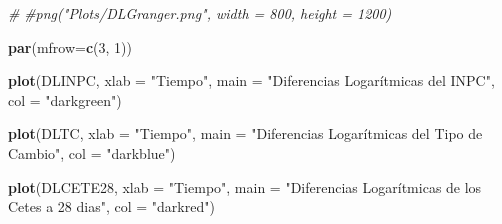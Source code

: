 \documentclass[
]{book}
\newenvironment{Shaded}{\begin{snugshade}}{\end{snugshade}}
\newcommand{\AttributeTok}[1]{\textcolor[rgb]{0.13,0.29,0.53}{#1}}
\newcommand{\CommentTok}[1]{\textcolor[rgb]{0.56,0.35,0.01}{\textit{#1}}}
\newcommand{\DecValTok}[1]{\textcolor[rgb]{0.00,0.00,0.81}{#1}}
\newcommand{\FunctionTok}[1]{\textcolor[rgb]{0.13,0.29,0.53}{\textbf{#1}}}
\newcommand{\NormalTok}[1]{#1}
\newcommand{\OtherTok}[1]{\textcolor[rgb]{0.56,0.35,0.01}{#1}}
\newcommand{\SpecialCharTok}[1]{\textcolor[rgb]{0.81,0.36,0.00}{\textbf{#1}}}
\newcommand{\StringTok}[1]{\textcolor[rgb]{0.31,0.60,0.02}{#1}}
\begin{document}
\begin{Shaded}
\end{Shaded}

\begin{Shaded}
\begin{Highlighting}[]
\CommentTok{\#}
\CommentTok{\#png("Plots/DLGranger.png", width = 800, height = 1200)}

\FunctionTok{par}\NormalTok{(}\AttributeTok{mfrow=}\FunctionTok{c}\NormalTok{(}\DecValTok{3}\NormalTok{, }\DecValTok{1}\NormalTok{))}

\FunctionTok{plot}\NormalTok{(DLINPC, }\AttributeTok{xlab =} \StringTok{"Tiempo"}\NormalTok{, }
     \AttributeTok{main =} \StringTok{"Diferencias Logarítmicas del INPC"}\NormalTok{,}
     \AttributeTok{col =} \StringTok{"darkgreen"}\NormalTok{)}

\FunctionTok{plot}\NormalTok{(DLTC, }\AttributeTok{xlab =} \StringTok{"Tiempo"}\NormalTok{, }
     \AttributeTok{main =} \StringTok{"Diferencias Logarítmicas del Tipo de Cambio"}\NormalTok{,}
     \AttributeTok{col =} \StringTok{"darkblue"}\NormalTok{)}

\FunctionTok{plot}\NormalTok{(DLCETE28, }\AttributeTok{xlab =} \StringTok{"Tiempo"}\NormalTok{, }
     \AttributeTok{main =} \StringTok{"Diferencias Logarítmicas de los Cetes a 28 dias"}\NormalTok{,}
     \AttributeTok{col =} \StringTok{"darkred"}\NormalTok{)}
\end{Highlighting}
\end{Shaded}
\end{document}
